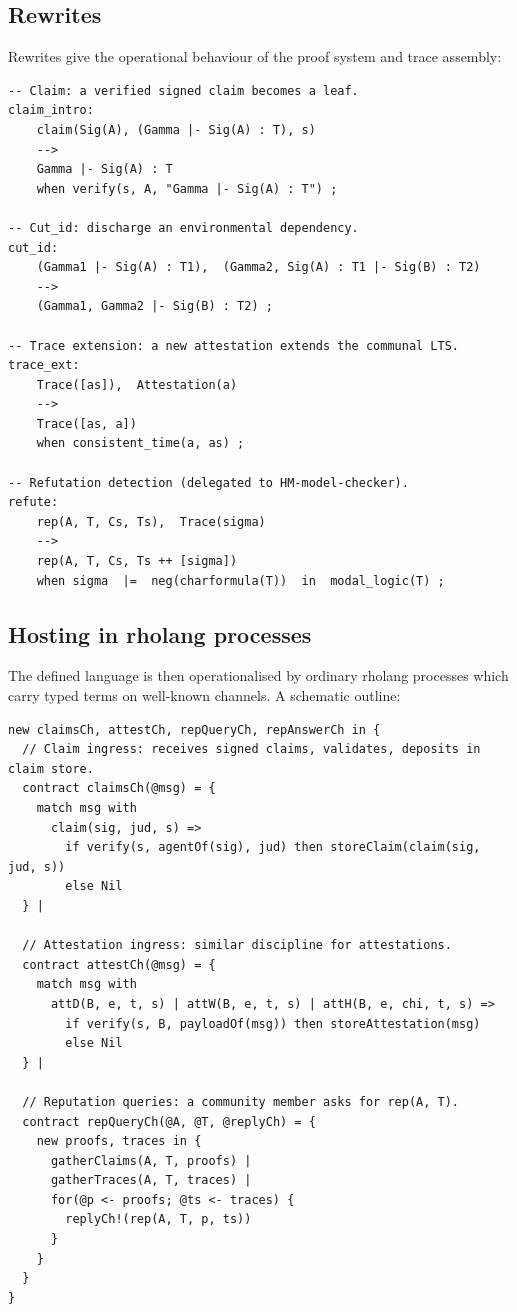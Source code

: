 \documentclass[11pt]{article}
\theoremstyle{definition}
\theoremstyle{plain}
\theoremstyle{remark}
\begin{document}
\subsection{Rewrites}

Rewrites give the operational behaviour of the proof system and trace assembly:

\begin{lstlisting}[language=rholang,caption={Proof-construction and trace-extension rewrites}]
-- Claim: a verified signed claim becomes a leaf.
claim_intro:
    claim(Sig(A), (Gamma |- Sig(A) : T), s)
    -->
    Gamma |- Sig(A) : T
    when verify(s, A, "Gamma |- Sig(A) : T") ;

-- Cut_id: discharge an environmental dependency.
cut_id:
    (Gamma1 |- Sig(A) : T1),  (Gamma2, Sig(A) : T1 |- Sig(B) : T2)
    -->
    (Gamma1, Gamma2 |- Sig(B) : T2) ;

-- Trace extension: a new attestation extends the communal LTS.
trace_ext:
    Trace([as]),  Attestation(a)
    -->
    Trace([as, a])
    when consistent_time(a, as) ;

-- Refutation detection (delegated to HM-model-checker).
refute:
    rep(A, T, Cs, Ts),  Trace(sigma)
    -->
    rep(A, T, Cs, Ts ++ [sigma])
    when sigma  |=  neg(charformula(T))  in  modal_logic(T) ;
\end{lstlisting}

\subsection{Hosting in rholang processes}

The defined language is then operationalised by ordinary rholang processes which carry typed terms on well-known channels. A schematic outline:

\begin{lstlisting}[language=rholang,caption={Rholang processes hosting the reputation language}]
new claimsCh, attestCh, repQueryCh, repAnswerCh in {
  // Claim ingress: receives signed claims, validates, deposits in claim store.
  contract claimsCh(@msg) = {
    match msg with
      claim(sig, jud, s) =>
        if verify(s, agentOf(sig), jud) then storeClaim(claim(sig, jud, s))
        else Nil
  } |

  // Attestation ingress: similar discipline for attestations.
  contract attestCh(@msg) = {
    match msg with
      attD(B, e, t, s) | attW(B, e, t, s) | attH(B, e, chi, t, s) =>
        if verify(s, B, payloadOf(msg)) then storeAttestation(msg)
        else Nil
  } |

  // Reputation queries: a community member asks for rep(A, T).
  contract repQueryCh(@A, @T, @replyCh) = {
    new proofs, traces in {
      gatherClaims(A, T, proofs) |
      gatherTraces(A, T, traces) |
      for(@p <- proofs; @ts <- traces) {
        replyCh!(rep(A, T, p, ts))
      }
    }
  }
}
\end{lstlisting}
\end{document}
